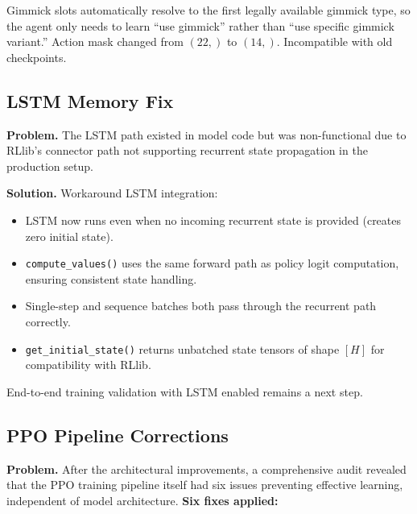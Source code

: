 Gimmick slots automatically resolve to the first legally available gimmick
type, so the agent only needs to learn ``use gimmick'' rather than ``use
specific gimmick variant.''  Action mask changed from $(22,)$ to $(14,)$.
Incompatible with old checkpoints.

\subsection{LSTM Memory Fix}
\label{sec:lstm_memory_fix}

\textbf{Problem.} The LSTM path existed in model code but was non-functional
due to RLlib's connector path not supporting recurrent state propagation in
the production setup.

\textbf{Solution.} Workaround LSTM integration:
\begin{itemize}
  \item LSTM now runs even when no incoming recurrent state is provided
        (creates zero initial state).
  \item \texttt{compute\_values()} uses the same forward path as policy logit
        computation, ensuring consistent state handling.
  \item Single-step and sequence batches both pass through the recurrent path
        correctly.
  \item \texttt{get\_initial\_state()} returns unbatched state tensors of shape
        $[H]$ for compatibility with RLlib.
\end{itemize}

End-to-end training validation with LSTM enabled remains a next step.

\subsection{PPO Pipeline Corrections}

\textbf{Problem.} After the architectural improvements, a comprehensive audit
revealed that the PPO training pipeline itself had six issues preventing
effective learning, independent of model architecture.
\textbf{Six fixes applied:}

